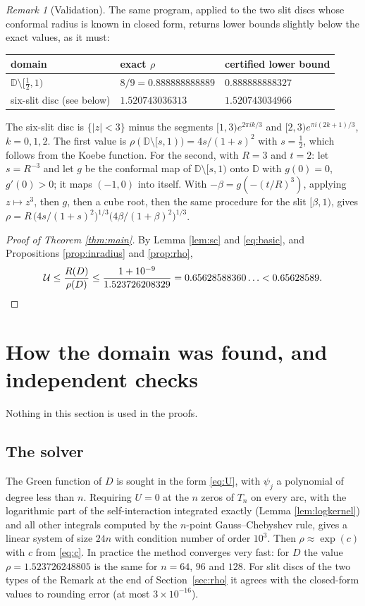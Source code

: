 \documentclass[11pt]{amsart}
\theoremstyle{remark}
\newtheorem{remark}[proposition]{Remark}
\newcommand{\U}{\mathcal U}
\newcommand{\D}{\mathbb D}
\begin{document}
\begin{remark}[Validation]
The same program, applied to the two slit discs whose conformal radius is known in closed form, returns lower
bounds slightly below the exact values, as it must:
\begin{center}\small
\begin{tabular}{lll}
\toprule
domain & exact $\rho$ & certified lower bound\\
\midrule
$\D\setminus[\frac12,1)$ & $8/9=0.888888888889$ & $0.888888888327$\\
six-slit disc (see below) & $1.520743036313$ & $1.520743034966$\\
\bottomrule
\end{tabular}
\end{center}
The six-slit disc is $\{|z|<3\}$ minus the segments $[1,3)e^{2\pi ik/3}$ and $[2,3)e^{\pi i(2k+1)/3}$, $k=0,1,2$.
The first value is $\rho(\D\setminus[s,1))=4s/(1+s)^2$ with $s=\frac12$, which follows from the Koebe function.
For the second, with $R=3$ and $t=2$: let $s=R^{-3}$ and let $g$ be the conformal map of $\D\setminus[s,1)$ onto
$\D$ with $g(0)=0$, $g'(0)>0$; it maps $(-1,0)$ into itself. With $-\beta=g(-(t/R)^3)$, applying $z\mapsto z^3$,
then $g$, then a cube root, then the same procedure for the slit $[\beta,1)$, gives
$\rho=R\,\bigl(4s/(1+s)^2\bigr)^{1/3}\bigl(4\beta/(1+\beta)^2\bigr)^{1/3}$.
\end{remark}

\begin{proof}[Proof of Theorem \ref{thm:main}]
By Lemma \ref{lem:sc} and \eqref{eq:basic}, and Propositions \ref{prop:inradius} and \ref{prop:rho},
\[
\U\le\frac{R(D)}{\rho(D)}\le\frac{1+10^{-9}}{1.523726208329}=0.65628588360\ldots<0.65628589.\qedhere
\]
\end{proof}

\section{How the domain was found, and independent checks}\label{sec:numerics}

Nothing in this section is used in the proofs.

\subsection*{The solver}
The Green function of $D$ is sought in the form \eqref{eq:U}, with $\psi_j$ a polynomial of degree less than $n$.
Requiring $U=0$ at the $n$ zeros of $T_n$ on every arc, with the logarithmic part of the self-interaction
integrated exactly (Lemma \ref{lem:logkernel}) and all other integrals computed by the $n$-point Gauss--Chebyshev
rule, gives a linear system of size $24n$ with condition number of order $10^3$. Then
$\rho\approx\exp(c)$ with $c$ from \eqref{eq:c}. In practice the method converges very fast: for $D$ the value
$\rho=1.523726248805$ is the same for $n=64$, $96$ and $128$. For slit discs of the two types of the Remark
at the end of Section~\ref{sec:rho} it agrees with the closed-form values to rounding error (at most
$3\times10^{-16}$).
\end{document}
